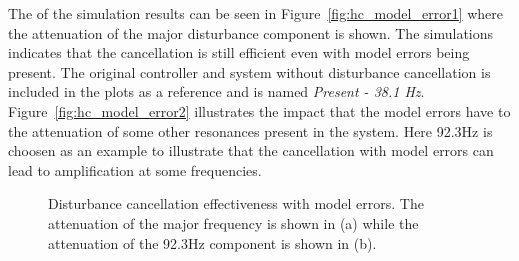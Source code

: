 The \abbrFFT of the simulation results can be seen in Figure~\ref{fig:hc_model_error1} where the attenuation of the major disturbance component is shown. The simulations indicates that the cancellation is still efficient even with model errors being present. The original controller and system without disturbance cancellation is included in the plots as a reference and is named \emph{Present - 38.1 Hz}. Figure~\ref{fig:hc_model_error2} illustrates the impact that the model errors have to the attenuation of some other resonances present in the system. Here 92.3Hz is choosen as an example to illustrate that the cancellation with model errors can lead to amplification at some frequencies.


\begin{figure}[h!]
  \centering %
  \qquad
  \caption{\label{fig:hc_model_error} Disturbance cancellation effectiveness with model errors. The attenuation of the major frequency is shown in (a) while the attenuation of the 92.3Hz component is shown in (b).}
\end{figure}


